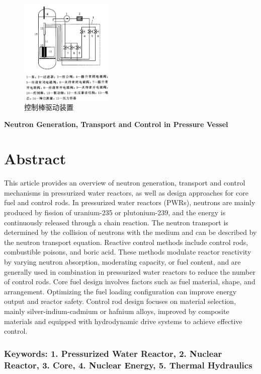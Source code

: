 \documentclass{article}
\begin{document}
\begin{figure}[htbp]
    \centering
    \includegraphics[width=0.4\textwidth]{figures/BoHanLiangHeFanYingDuiKongZhiBangShuiYaQuDongJiShu2005.png}
    \caption{控制棒驱动装置}
    \label{fig:control_rod_drive}
\end{figure}



\vspace{3em}

{
    \centering\textbf{\huge Neutron Generation, Transport and Control in Pressure Vessel}\\
}

\section*{Abstract}

This article provides an overview of neutron generation, transport and control mechanisms in pressurized water reactors, as well as design approaches for core fuel and control rods. In pressurized water reactors (PWRs), neutrons are mainly produced by fission of uranium-235 or plutonium-239, and the energy is continuously released through a chain reaction. The neutron transport is determined by the collision of neutrons with the medium and can be described by the neutron transport equation. Reactive control methods include control rods, combustible poisons, and boric acid. These methods modulate reactor reactivity by varying neutron absorption, moderating capacity, or fuel content, and are generally used in combination in pressurized water reactors to reduce the number of control rods. Core fuel design involves factors such as fuel material, shape, and arrangement. Optimizing the fuel loading configuration can improve energy output and reactor safety. Control rod design focuses on material selection, mainly silver-indium-cadmium or hafnium alloys, improved by composite materials and equipped with hydrodynamic drive systems to achieve effective control.

\subsubsection*{Keywords: 1. Pressurized Water Reactor, 2. Nuclear Reactor, 3. Core, 4. Nuclear Energy, 5. Thermal Hydraulics}
\end{document}
